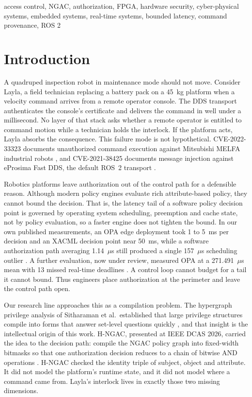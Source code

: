 \documentclass[conference]{IEEEtran}
\begin{document}
\begin{IEEEkeywords}
access control, NGAC, authorization, FPGA, hardware security, cyber-physical systems, embedded systems, real-time systems, bounded latency, command provenance, ROS 2
\end{IEEEkeywords}

\section{Introduction}

A quadruped inspection robot in maintenance mode should not move. Consider Layla, a field technician replacing a battery pack on a 45~kg platform when a velocity command arrives from a remote operator console. The DDS transport authenticates the console's certificate and delivers the command in well under a millisecond. No layer of that stack asks whether a remote operator is entitled to command motion while a technician holds the interlock. If the platform acts, Layla absorbs the consequence. This failure mode is not hypothetical. CVE-2022-33323 documents unauthorized command execution against Mitsubishi MELFA industrial robots \cite{cve202233323}, and CVE-2021-38425 documents message injection against eProsima Fast DDS, the default ROS~2 transport \cite{cve202138425}.

Robotics platforms leave authorization out of the control path for a defensible reason. Although modern policy engines evaluate rich attribute-based policy, they cannot bound the decision. That is, the latency tail of a software policy decision point is governed by operating system scheduling, preemption and cache state, not by policy evaluation, so a faster engine does not tighten the bound. In our own published measurements, an OPA edge deployment took 1 to 5~ms per decision and an XACML decision point near 50~ms, while a software authorization path averaging 1.14~$\mu$s still produced a single 157~$\mu$s scheduling outlier \cite{karim2026dcas}. A further evaluation, now under review, measured OPA at a 271.491~$\mu$s mean with 13 missed real-time deadlines \cite{karim2026tsngac}. A control loop cannot budget for a tail it cannot bound. Thus engineers place authorization at the perimeter and leave the control path open.

Our research line approaches this as a compilation problem. The hypergraph privilege analysis of Sitharaman et al.\ established that large privilege structures compile into forms that answer set-level questions quickly \cite{sitharaman2025hypergraph}, and that insight is the intellectual origin of this work. H-NGAC, presented at IEEE DCAS 2026, carried the idea to the decision path: compile the NGAC policy graph \cite{incits565, ferraiolo2011policymachine} into fixed-width bitmasks so that one authorization decision reduces to a chain of bitwise AND operations \cite{karim2026dcas}. H-NGAC checked the identity triple of subject, object and attribute. It did not model the platform's runtime state, and it did not model where a command came from. Layla's interlock lives in exactly those two missing dimensions.
\end{document}
